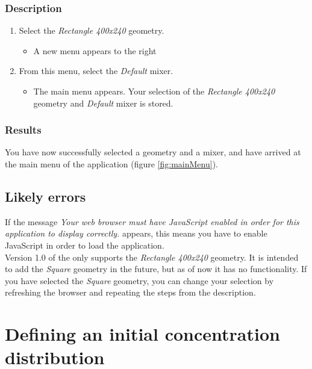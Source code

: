 \subsubsection{Description}

\begin{enumerate}
\item Select the \emph{Rectangle 400x240} geometry.
    \begin{itemize}
      \item A new menu appears to the right
    \end{itemize}
\item From this menu, select the \emph{Default} mixer.
    \begin{itemize}
      \item The main menu appears. Your selection of the \emph{Rectangle 400x240} geometry and \emph{Default} mixer is stored.
    \end{itemize}
\end{enumerate}

\subsubsection{Results}
You have now successfully selected a geometry and a mixer, and have arrived at the main menu of the application (figure \ref{fig:mainMenu}).


\subsection{Likely errors}
If the message \emph{Your web browser must have JavaScript enabled in order for this application to display correctly.} appears, this means you have to enable JavaScript in order to load the application.\\

\noindent Version 1.0 of the \applicationname{} only supports the \emph{Rectangle 400x240} geometry. It is intended to add the \emph{Square} geometry in the future, but as of now it has no functionality. If you have selected the \emph{Square} geometry, you can change your selection by refreshing the browser and repeating the steps from the description.


\section{Defining an initial concentration distribution}
\label{sec:defineDist}


